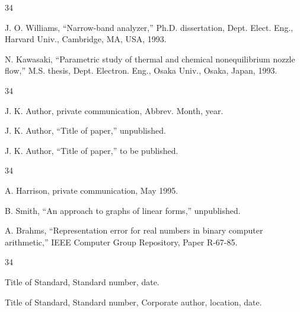 \documentclass{IEEEjmw}
\begin{document}
\vspace*{-12pt}

\begin{thebibliography}{34}
\setcounter{enumiv}{24}

\bibitem{}J. O. Williams, ``Narrow-band analyzer,'' Ph.D. dissertation, Dept. Elect. Eng., Harvard Univ., Cambridge, MA, USA, 1993.

\bibitem{}N. Kawasaki, ``Parametric study of thermal and chemical nonequilibrium nozzle flow,'' M.S. thesis, Dept. Electron. Eng., Osaka Univ., Osaka, Japan, 1993.
\end{thebibliography}

\vspace*{-12pt}
\begin{thebibliography}{34}\itemindent-6.5pt
\item[a)] J. K. Author, private communication, Abbrev. Month, year.

\item[b)] J. K. Author, ``Title of paper,'' unpublished.

\item[c)] J. K. Author, ``Title of paper,'' to be published.
\end{thebibliography}\vspace*{-14pt}

\vspace*{-12pt}

\begin{thebibliography}{34}
\setcounter{enumiv}{26}

\bibitem{}A. Harrison, private communication, May 1995.

\bibitem{}B. Smith, ``An approach to graphs of linear forms,'' unpublished.

\bibitem{}A. Brahms, ``Representation error for real numbers in binary computer arithmetic,'' IEEE Computer Group Repository, Paper R-67-85.
\end{thebibliography}

\vspace*{-12pt}
\begin{thebibliography}{34}\itemindent-6.5pt
\item[a)] {Title of Standard}, Standard number, date.

\item[b)] {Title of Standard}, Standard number, Corporate author, location, date.
\end{thebibliography}\vspace*{-14pt}
\end{document}
